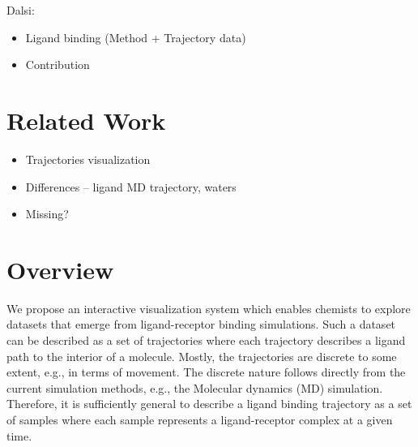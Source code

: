 \documentclass{vgtc}                          %
\begin{document}


Dalsi:
\begin{itemize}
  \item Ligand binding (Method + Trajectory data)
  \item Contribution
\end{itemize}

\section{Related Work}

\begin{itemize}
  \item Trajectories visualization
  \item Differences -- ligand MD trajectory, waters
  \item Missing?
\end{itemize}

\section{Overview}

We propose an interactive visualization system which enables chemists to explore datasets that emerge from ligand-receptor binding simulations.
Such a dataset can be described as a set of trajectories where each trajectory describes a ligand path to the interior of a molecule.
Mostly, the trajectories are discrete to some extent, e.g., in terms of movement.
The discrete nature follows directly from the current simulation methods, e.g., the Molecular dynamics (MD) simulation.
Therefore, it is sufficiently general to describe a ligand binding trajectory as a set of samples where each sample represents a ligand-receptor complex at a given time.
\end{document}
